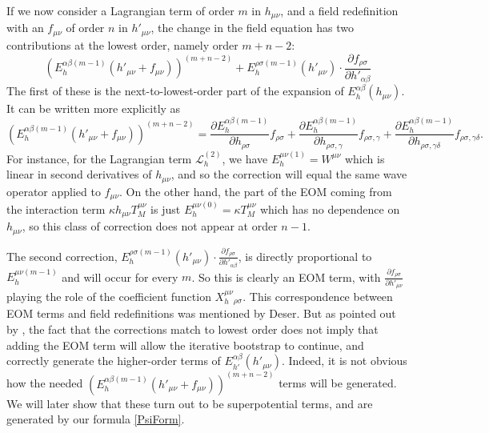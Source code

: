 \documentclass[aps,physrev,preprint,groupedaddress]{revtex4-2}
\begin{document}
If we now consider a Lagrangian term of order \(m\) in \(h_{\mu\nu}\), and a field redefinition with an \(f_{\mu\nu}\) of order \(n\) in \(h'_{\mu\nu}\), the change in the field equation has two contributions at the lowest order, namely order \(m+n-2\):
\begin{equation}\label{redefEh}
\left(E_{h}^{\alpha\beta(m-1)}(h'_{\mu\nu}+f_{\mu\nu})\right)^{(m+n-2)}+E_{h}^{\rho\sigma(m-1)}(h'_{\mu\nu})\cdot\frac{\partial f_{\rho\sigma}}{\partial h'_{\alpha\beta}}
\end{equation}
The first of these is the next-to-lowest-order part of the expansion of \(E_h^{\alpha\beta}(h_{\mu\nu})\). It can be written more explicitly as 
\begin{equation}
\left(E_{h}^{\alpha\beta(m-1)}(h'_{\mu\nu}+f_{\mu\nu})\right)^{(m+n-2)}=\frac{\partial E_h^{\alpha\beta(m-1)}}{\partial h_{\rho\sigma}}f_{\rho\sigma}+\frac{\partial E_h^{\alpha\beta(m-1)}}{\partial h_{\rho\sigma,\gamma}}f_{\rho\sigma,\gamma}+\frac{\partial E_h^{\alpha\beta(m-1)}}{\partial h_{\rho\sigma,\gamma\delta}}f_{\rho\sigma,\gamma\delta}.
\end{equation}
For instance, for the Lagrangian term \(\mathcal{L}_h^{(2)}\), we have \(E_h^{\mu\nu(1)}=W^{\mu\nu}\) which is linear in second derivatives of \(h_{\mu\nu}\), and so the correction will equal the same wave operator applied to \(f_{\mu\nu}\). On the other hand, the part of the EOM coming from the interaction term \(\kappa h_{\mu\nu}T^{\mu\nu}_M\) is just \(E_h^{\mu\nu(0)}=\kappa T_M^{\mu\nu}\) which has no dependence on \(h_{\mu\nu}\), so this class of correction does not appear at order \(n-1\). 

The second correction, \(E_{h}^{\rho\sigma(m-1)}(h'_{\mu\nu})\cdot\frac{\partial f_{\rho\sigma}}{\partial h'_{\alpha\beta}}\), is directly proportional to \(E_{h}^{\mu\nu(m-1)}\) and will occur for every \(m\). So this is clearly an EOM term, with \(\frac{\partial f_{\rho\sigma}}{\partial h'_{\mu\nu}}\) playing the role of the coefficient function \(X_h^{\mu\nu}{}_{\rho\sigma}\). This correspondence between EOM terms and field redefinitions was mentioned by Deser\cite{Deser}. But as pointed out by \cite{Barcelo}, the fact that the corrections match to lowest order does not imply that adding the EOM term will allow the iterative bootstrap to continue, and correctly generate the higher-order terms of \(E_{h'}^{\alpha\beta}(h'_{\mu\nu})\). Indeed, it is not obvious how the needed \(\left(E_{h}^{\alpha\beta(m-1)}(h'_{\mu\nu}+f_{\mu\nu})\right)^{(m+n-2)}\) terms will be generated. We will later show that these turn out to be superpotential terms, and are generated by our formula \eqref{PsiForm}.
\end{document}
